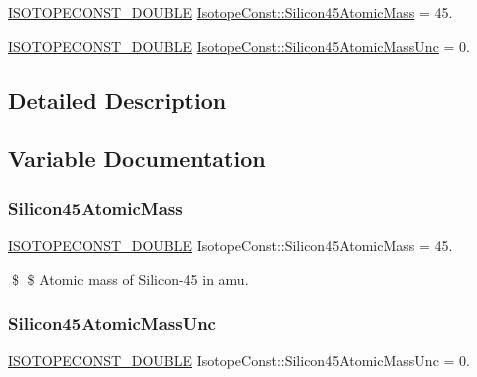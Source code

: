 \begin{DoxyCompactItemize}
\item 
\mbox{\hyperlink{group___isotope_const-_macros_ga8f45a7272ce02c0b4c65c44636ed719a}{I\+S\+O\+T\+O\+P\+E\+C\+O\+N\+S\+T\+\_\+\+D\+O\+U\+B\+LE}} \mbox{\hyperlink{group___isotope_const-_silicon-_si45_ga1d5a090983fd5edb2cee2f2adcb1dfc3}{Isotope\+Const\+::\+Silicon45\+Atomic\+Mass}} = 45.
\item 
\mbox{\hyperlink{group___isotope_const-_macros_ga8f45a7272ce02c0b4c65c44636ed719a}{I\+S\+O\+T\+O\+P\+E\+C\+O\+N\+S\+T\+\_\+\+D\+O\+U\+B\+LE}} \mbox{\hyperlink{group___isotope_const-_silicon-_si45_ga22f34218904b0aa8ba3f908e4fe75acc}{Isotope\+Const\+::\+Silicon45\+Atomic\+Mass\+Unc}} = 0.
\end{DoxyCompactItemize}


\subsection{Detailed Description}


\subsection{Variable Documentation}
\mbox{\label{group___isotope_const-_silicon-_si45_ga1d5a090983fd5edb2cee2f2adcb1dfc3}} 
\subsubsection{\texorpdfstring{Silicon45\+Atomic\+Mass}{Silicon45AtomicMass}}
{\footnotesize\ttfamily \mbox{\hyperlink{group___isotope_const-_macros_ga8f45a7272ce02c0b4c65c44636ed719a}{I\+S\+O\+T\+O\+P\+E\+C\+O\+N\+S\+T\+\_\+\+D\+O\+U\+B\+LE}} Isotope\+Const\+::\+Silicon45\+Atomic\+Mass = 45.}

\$ \$ Atomic mass of Silicon-\/45 in amu. \mbox{\label{group___isotope_const-_silicon-_si45_ga22f34218904b0aa8ba3f908e4fe75acc}} 
\subsubsection{\texorpdfstring{Silicon45\+Atomic\+Mass\+Unc}{Silicon45AtomicMassUnc}}
{\footnotesize\ttfamily \mbox{\hyperlink{group___isotope_const-_macros_ga8f45a7272ce02c0b4c65c44636ed719a}{I\+S\+O\+T\+O\+P\+E\+C\+O\+N\+S\+T\+\_\+\+D\+O\+U\+B\+LE}} Isotope\+Const\+::\+Silicon45\+Atomic\+Mass\+Unc = 0.}

